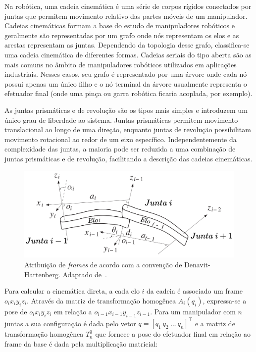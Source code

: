 Na robótica, uma cadeia cinemática é uma série de corpos rígidos conectados por 
juntas que permitem movimento relativo das partes móveis de um manipulador. 
Cadeias cinemáticas formam a base do estudo de manipuladores robóticos e geralmente 
são representadas por um grafo onde nós representam os elos e as arestas 
representam as juntas. Dependendo da topologia desse grafo, classifica-se 
uma cadeia cinemática de diferentes formas. Cadeias seriais do tipo aberta
são as mais comuns no âmbito de manipuladores robóticos utilizados 
em aplicações industriais. Nesses casos, seu grafo é representado por uma árvore 
onde cada nó possui apenas um único filho e o nó terminal da 
árvore usualmente representa o efetuador final (onde uma pinça ou garra robótica ficaria
acoplada, por exemplo).

As juntas prismáticas e de revolução são os tipos mais simples e introduzem um 
único grau de liberdade ao sistema. Juntas prismáticas permitem movimento 
translacional ao longo de uma direção, enquanto juntas de revolução possibilitam 
movimento rotacional ao redor de um eixo específico. Independentemente da 
complexidade das juntas, a maioria pode ser reduzida a uma combinação de juntas 
prismáticas e de revolução, facilitando a descrição das cadeias cinemáticas.

\begin{figure}
    \centering
    \includegraphics[width=0.8\linewidth]{Images/dh-assignment.png}
    \caption{Atribuição de \emph{frames} de acordo com a convenção de Denavit-Hartenberg. Adaptado de~\cite{spong_robot_2020}.}\label{fig:dh-assignment}
\end{figure}

Para calcular a cinemática direta, a cada elo \(i\) da cadeia é associado um frame 
\(o_i x_i y_i z_i\). Através da matriz de transformação homogênea \(A_i(q_i)\), expressa-se 
a pose de \(o_i x_i y_i z_i\) em relação a 
\(o_{i-1} x_{i-1} y_{i-1} z_{i-1}\). Para um manipulador com \(n\) juntas a sua configuração é dada pelo vetor \(q = [q_1 \ q_2 \ \ldots \ q_n]^\top\)
e a matriz de transformação homogênea \(T^0_n\) que fornece a pose
do efetuador final em relação ao frame da base é dada pela multiplicação matricial:

